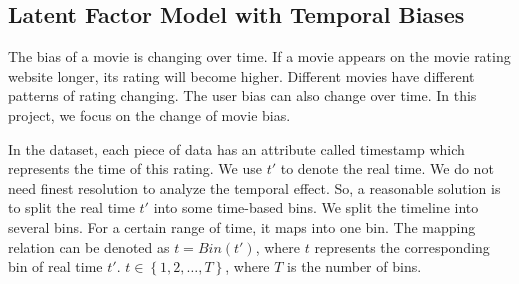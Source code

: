 \documentclass[sigconf]{acmart}
\begin{document}
\subsection{Latent Factor Model with Temporal Biases}
\item{

The bias of a movie is changing over time. If a movie appears on the movie rating website longer, its rating will become higher. Different movies have different patterns of rating changing. The user bias can also change over time. In this project, we focus on the change of movie bias.

In the dataset, each piece of data has an attribute called timestamp which represents the time of this rating. We use $t'$ to denote the real time. We do not need finest resolution to analyze the temporal effect. So, a reasonable solution is to split the real time $t'$ into some time-based bins\cite{cf-temporal}. We split the timeline into several bins. For a certain range of time, it maps into one bin. The mapping relation can be denoted as $t = Bin(t')$, where $t$ represents the corresponding bin of real time $t'$. $t \in \left\{ 1, 2, \dots, T \right\}$, where $T$ is the number of bins. 

}
\end{document}
